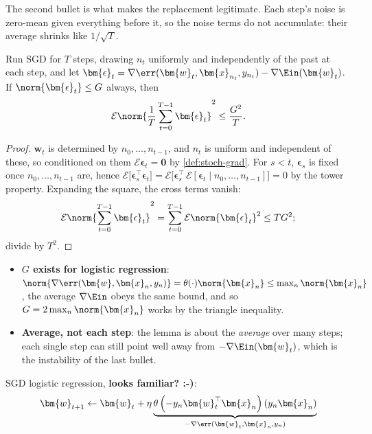 The second bullet is what makes the replacement legitimate. Each step's noise
is zero-mean given everything before it, so the noise terms do not accumulate:
their average shrinks like \(1/\sqrt{T}\).

\begin{lemma}\label{lem:sgd-noise}
    Run SGD for \(T\) steps, drawing \(n_t\) uniformly and independently of
    the past at each step, and let \(\bm{\epsilon}_t = \nabla \err(\bm{w}_t,
    \bm{x}_{n_t}, y_{n_t}) - \nabla \Ein(\bm{w}_t)\). If \(\norm{\bm{\epsilon}_t}
    \le G\) always, then
    \[
        \mathcal{E} \norm{\frac{1}{T} \sum_{t=0}^{T-1} \bm{\epsilon}_t}^2 \le
        \frac{G^2}{T} .
    \]
\end{lemma}

\begin{proof}
    \(\bm{w}_t\) is determined by \(n_0, \dots , n_{t-1}\), and \(n_t\) is
    uniform and independent of these, so conditioned on them \(\mathcal{E}
    \bm{\epsilon}_t = \bm{0}\) by \autoref{def:stoch-grad}. For \(s < t\),
    \(\bm{\epsilon}_s\) is fixed once \(n_0, \dots , n_{t-1}\) are, hence
    \(\mathcal{E} \bigl[ \bm{\epsilon}_s^\top \bm{\epsilon}_t \bigr] =
    \mathcal{E} \bigl[ \bm{\epsilon}_s^\top \, \mathcal{E} [\bm{\epsilon}_t
    \mid n_0, \dots , n_{t-1}] \bigr] = 0\) by the tower property. Expanding
    the square, the cross terms vanish:
    \[
        \mathcal{E} \norm{\sum_{t=0}^{T-1} \bm{\epsilon}_t}^2 = \sum_{t=0}^{T-1}
        \mathcal{E} \norm{\bm{\epsilon}_t}^2 \le T G^2 ;
    \]
    divide by \(T^2\).
\end{proof}

\begin{itemize}
    \item \textbf{\(G\) exists for logistic regression}: \(\norm{\nabla
        \err(\bm{w}, \bm{x}_n, y_n)} = \theta(\cdot) \norm{\bm{x}_n} \le \max_n
        \norm{\bm{x}_n}\), the average \(\nabla \Ein\) obeys the same bound, and
        so \(G = 2 \max_n \norm{\bm{x}_n}\) works by the triangle inequality.
    \item \textbf{Average, not each step}: the lemma is about the \emph{average}
        over many steps; each single step can still point well away from
        \(-\nabla \Ein(\bm{w}_t)\), which is the instability of the last bullet.
\end{itemize}

SGD logistic regression, \textcolor{orange!85!black}{\textbf{looks familiar?
:-)}}:
\[
    \bm{w}_{t+1} \gets \bm{w}_t + \eta \underbrace{\theta \left( -y_n
    \bm{w}_t^\top \bm{x}_n \right) \left( y_n \bm{x}_n
    \right)}_{-\nabla \err(\bm{w}_t, \bm{x}_n, y_n)}
\]

